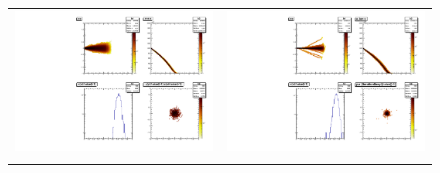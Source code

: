 \documentclass [11pt,a4paper,dvipdfmx] {jarticle}
\begin{document}
\begin{figure}[H]
\begin{center}
\begin{tabular}{c c}
        \begin{minipage}{0.45\linewidth}   
            \begin{center}
            \includegraphics[width=\linewidth]{./pic/TrackSrim.pdf}
            \end{center}
        \end{minipage}
        &
        \begin{minipage}{0.45\linewidth}   
            \begin{center}
            \includegraphics[width=\linewidth]{./pic/TrackTrimSQLite.pdf}
            \end{center}
        \end{minipage}
        \\
        \begin{minipage}{0.45\linewidth}   

\end{minipage}
\end{tabular}
\end{center}
\end{figure}
\end{document}
